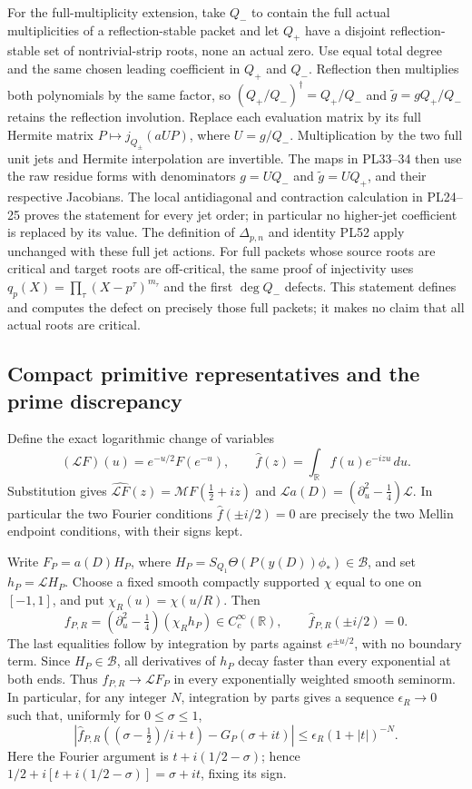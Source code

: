 For the full-multiplicity extension, take \(Q_-\) to contain the full
actual multiplicities of a reflection-stable packet and let \(Q_+\)
have a disjoint reflection-stable set of nontrivial-strip roots,
none an actual zero. Use equal total degree and the same chosen
leading coefficient in \(Q_+\) and \(Q_-\).
Reflection then multiplies both polynomials by the same factor,
so \((Q_+/Q_-)^\dagger=Q_+/Q_-\) and
\(\widetilde g=gQ_+/Q_-\) retains the reflection involution.
Replace each evaluation matrix by its full Hermite matrix
\(P\mapsto j_{Q_\pm}(aUP)\), where \(U=g/Q_-\).
Multiplication by the two full unit jets and Hermite interpolation
are invertible. The maps in PL33--34 then use the raw residue forms
with denominators \(g=UQ_-\) and \(\widetilde g=UQ_+\), and their
respective Jacobians. The local antidiagonal and contraction
calculation in PL24--25 proves the statement for every jet order;
in particular no higher-jet coefficient is replaced by its value.
The definition of \(\Delta_{p,n}\) and identity PL52 apply unchanged
with these full jet actions. For full packets whose source roots
are critical and target roots are off-critical, the same proof of injectivity
uses \(q_p(X)=\prod_{\tau}(X-p^\tau)^{m_\tau}\) and the first
\(\deg Q_-\) defects. This statement defines and computes the
defect on precisely those full packets; it makes no claim that
all actual roots are critical.

\subsection{Compact primitive representatives and the prime discrepancy}
Define the exact logarithmic change of variables
\[
 (\mathscr LF)(u)=e^{-u/2}F(e^{-u}),\qquad
 \widehat f(z)=\int_{\mathbb R}f(u)e^{-izu}\,du.
 \tag{PL36}
\]
Substitution gives
\(\widehat{\mathscr LF}(z)=\mathcal M F(\tfrac12+iz)\) and
\(\mathscr La(D)=(\partial_u^2-\tfrac14)\mathscr L\).
In particular the two Fourier conditions
\(\widehat f(\pm i/2)=0\) are precisely the two Mellin endpoint
conditions, with their signs kept.

Write \(F_P=a(D)H_P\), where
\(H_P=S_{Q_1}\Theta(P(y(D))\phi_*)\in\mathscr B\), and set
\(h_P=\mathscr LH_P\).
Choose a fixed smooth compactly supported \(\chi\) equal to one
on \([-1,1]\), and put \(\chi_R(u)=\chi(u/R)\). Then
\[
 f_{P,R}=(\partial_u^2-\tfrac14)(\chi_Rh_P)
             \in C_c^\infty(\mathbb R),\qquad
 \widehat f_{P,R}(\pm i/2)=0.
 \tag{PL37}\label{pl:pl:compact}
\]
The last equalities follow by integration by parts against
\(e^{\pm u/2}\), with no boundary term.
Since \(H_P\in\mathscr B\), all derivatives of \(h_P\) decay faster than
every exponential at both ends. Thus \(f_{P,R}\to\mathscr LF_P\)
in every exponentially weighted smooth seminorm.
In particular, for any integer \(N\), integration by parts gives
a sequence \(\epsilon_R\to0\) such that, uniformly for
\(0\le\sigma\le1\),
\[
 |\widehat f_{P,R}((\sigma-\tfrac12)/i+t)
          -G_P(\sigma+it)|\le\epsilon_R(1+|t|)^{-N}.
 \tag{PL38}\label{pl:pl:approx}
\]
Here the Fourier argument is \(t+i(1/2-\sigma)\); hence
\(1/2+i[t+i(1/2-\sigma)]=\sigma+it\), fixing its sign.

